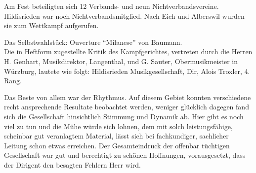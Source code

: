 \begin{history}
    Am Fest beteiligten sich 12 Verbands- und neun Nichtverbandsvereine.
    Hildisrieden war noch Nichtverbandsmitglied. Nach Eich und Alberswil wurden
    sie zum Wettkampf aufgerufen.

    Das Selbstwahlstück: Ouverture \enquote{Milanese} von Baumann.\\
    Die in Heftform zugestellte Kritik des Kampfgerichtes, vertreten durch die
    Herren H. Genhart, Musikdirektor, Langenthal, und G. Sauter,
    Obermusikmeister in Würzburg, lautete wie folgt: Hildisrieden
    Musikgesellschaft, Dir, Alois Troxler, 4. Rang.

    Das Beste von allem war der Rhythmus. Auf diesem Gebiet konnten verschiedene
    recht ansprechende Resultate beobachtet werden, weniger glücklich dagegen
    fand sich die Gesellschaft hinsichtlich Stimmung und Dynamik ab. Hier gibt
    es noch viel zu tun und die Mühe würde sich lohnen, dem mit solch
    leistungsfähige, scheinbar gut veranlagtem Material, lässt sich bei
    fachkundiger, sachlicher Leitung schon etwas erreichen. Der Gesamteindruck
    der offenbar tüchtigen Gesellschaft war gut und berechtigt zu schönen
    Hoffnungen, vorausgesetzt, dass der Dirigent den besagten Fehlern Herr wird.


\end{history}
